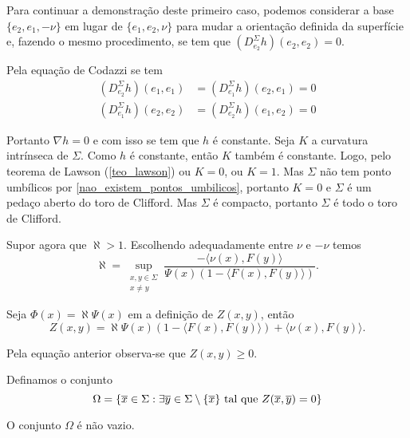 Para continuar a demonstração deste primeiro caso, podemos considerar a base $\{ e_2, e_1, -\nu \}$ em lugar de $\{ e_1, e_2, \nu \}$ para mudar a orientação definida da superfície e, fazendo o mesmo procedimento, se tem que $(D_{e_2}^{\Sigma} h) (e_2,e_2)=0$.

Pela equação de Codazzi se tem
\begin{align*}
	(D_{e_2}^{\Sigma} h) (e_1,e_1) &= (D_{e_1}^{\Sigma} h) (e_2,e_1) = 0\\
	(D_{e_1}^{\Sigma} h) (e_2,e_2) &= (D_{e_2}^{\Sigma} h) (e_1,e_2) = 0
\end{align*}

Portanto $\nabla h = 0$ e com isso se tem que $h$ é constante. Seja $K$ a curvatura intrínseca de $\Sigma$. Como $h$ é constante, então $K$ também é constante. Logo, pelo teorema de Lawson (\ref{teo_lawson}) ou $K=0$, ou $K=1$. Mas $\Sigma$ não tem ponto umbílicos por \ref{nao_existem_pontos_umbilicos}, portanto $K=0$ e $\Sigma$ é um pedaço aberto do toro de Clifford. Mas $\Sigma$ é compacto, portanto $\Sigma$ é todo o toro de Clifford.

Supor agora que $\aleph > 1$. Escolhendo adequadamente entre $\nu$ e $-\nu$ temos
\begin{equation*}
	\aleph = \sup_{\substack{x,y \in \Sigma\\ x \neq y}} \frac{- \langle \nu(x), F(y) \rangle}{\Psi(x)(1 - \langle F(x), F(y) \rangle)}.
\end{equation*}

Seja $\Phi(x) = \aleph \Psi(x)$ em a definição de $Z(x,y)$, então
\begin{equation*}
	Z(x,y) = \aleph \Psi(x)(1 - \langle F(x), F(y) \rangle) + \langle \nu(x), F(y) \rangle.
\end{equation*}

Pela equação anterior observa-se que $Z(x,y) \geq 0$.

Definamos o conjunto
\begin{equation*}
	\Omega = \{ \overline{x} \in \Sigma: \exists \overline{y} \in \Sigma \setminus \{\overline{x}\} \text{ tal que } Z(\overline{x},\overline{y}) = 0 \}
\end{equation*}

O conjunto $\Omega$ é não vazio.

